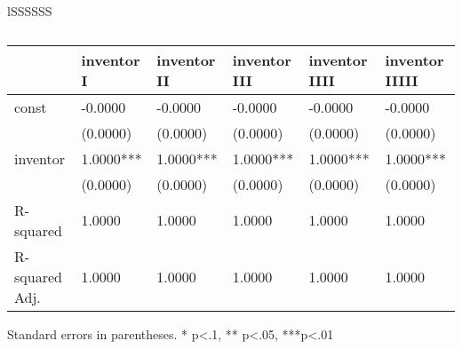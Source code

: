 \documentclass{article}
\begin{document}
\begin{table}[h]
\centering
\caption{Statistical tests for college-level innovation rates by parental income quintile}
\begin{tabular}{lSSSSSS}
\toprule
\begin{table}
\caption{}
\label{}
\begin{center}
\begin{tabular}{llllll}
\hline
               & inventor I & inventor II & inventor III & inventor IIII & inventor IIIII  \\
\hline
const          & -0.0000    & -0.0000     & -0.0000      & -0.0000       & -0.0000         \\
               & (0.0000)   & (0.0000)    & (0.0000)     & (0.0000)      & (0.0000)        \\
inventor       & 1.0000***  & 1.0000***   & 1.0000***    & 1.0000***     & 1.0000***       \\
               & (0.0000)   & (0.0000)    & (0.0000)     & (0.0000)      & (0.0000)        \\
R-squared      & 1.0000     & 1.0000      & 1.0000       & 1.0000        & 1.0000          \\
R-squared Adj. & 1.0000     & 1.0000      & 1.0000       & 1.0000        & 1.0000          \\
\hline
\end{tabular}
\end{center}
\end{table}
\bigskip
Standard errors in parentheses. \newline 
* p<.1, ** p<.05, ***p<.01\bottomrule
\end{tabular}
\end{table}
\end{document}
